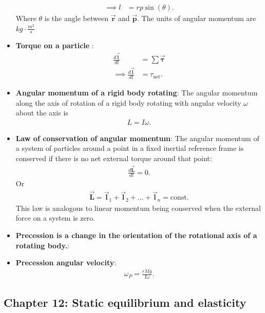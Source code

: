 \documentclass{report}
\begin{document}
\begin{itemize}
\begin{align*}
                \implies  l &= rp\sin{\left(\theta \right)}
            .\end{align*}
            Where $\theta$ is the angle between $\vec{\mathbf{r}}$ and $\vec{\mathbf{p}}$. The units of angular momentum are $kg \cdot  \frac{m^{2}}{s} $
        \item \textbf{Torque on a particle }:
            \begin{align*}
                \frac{d\vec{\mathbf{l}}}{dt} &= \sum \vec{\mathbf{\tau}} \\
                \implies\frac{d\vec{\mathbf{l}}}{dt} &= \tau_{\text{net}}
            .\end{align*}
        \item \textbf{Angular momentum of a rigid body rotating}: The angular momentum along the axis of rotation of a rigid body rotating with angular velocity $\omega$ about the axis is
            \begin{align*}
                L = I\omega
            .\end{align*}
        \item \textbf{Law of conservation of angular momentum}:
            The angular momentum of a system of particles around a point in a fixed inertial reference frame is conserved if there is no net external torque around that point:
            \begin{align*}
                \frac{d\vec{\mathbf{L}}}{dt} = 0
            .\end{align*}
            Or
            \begin{align*}
             \vec{\mathbf{L}} = \vec{\mathbf{l}}_{1} + \vec{\mathbf{l}}_{2} + ... + \vec{\mathbf{l}}_{n} = \text{const}   
            .\end{align*}
            \bigbreak \noindent 
            This law is analogous to linear momentum being conserved when the external force on a system is zero.
    \item \textbf{Precession is a change in the orientation of the rotational axis of a rotating body.}:
    \item \textbf{Precession angular velocity}:
        \begin{align*}
            \omega_{P} = \frac{rMg}{I\omega}
        .\end{align*}
    \end{itemize}

    \pagebreak 
    \subsection{Chapter 12: Static equilibrium and elasticity}
    \bigbreak \noindent 
\end{document}
